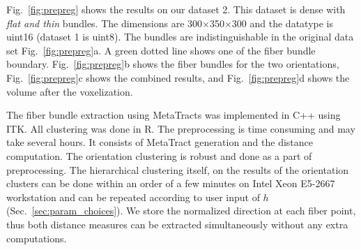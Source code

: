 Fig.~\ref{fig:prepreg} shows the results on our dataset 2. This dataset is dense with \textit{flat and thin} bundles. The dimensions are 300$\times$350$\times$300 and the datatype is uint16 (dataset 1 is uint8). The bundles are indistinguishable in the original data set Fig.~\ref{fig:prepreg}a. A green dotted line shows one of the fiber bundle boundary. Fig.~\ref{fig:prepreg}b shows the fiber bundles for the two orientations, Fig.~\ref{fig:prepreg}c shows the combined results, and Fig.~\ref{fig:prepreg}d shows the volume after the voxelization.

The fiber bundle extraction using MetaTracts was implemented in C++ using ITK. All clustering was done in R. The preprocessing is time consuming and may take several hours. It consists of MetaTract generation and the distance computation. The orientation clustering is robust and done as a part of preprocessing. The hierarchical clustering itself, on the results of the orientation clusters can be done within an order of a few minutes on Intel Xeon E5-2667 workstation and can be repeated according to user input of $h$ (Sec.~\ref{sec:param_choices}). We store the normalized direction at each fiber point, thus both distance measures can be extracted simultaneously without any extra computations.



